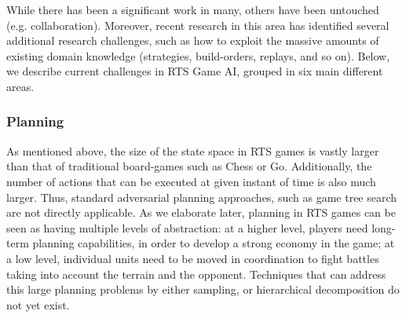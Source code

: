 \documentclass[journal]{IEEEtran}
\begin{document}
While there has been a significant work in many, others have been untouched (e.g. collaboration). Moreover, recent research in this area has identified several additional research challenges, such as how to exploit the massive amounts of existing domain knowledge (strategies, build-orders, replays, and so on). Below, we describe current challenges in RTS Game AI, grouped in six main different areas.


\subsubsection{Planning}
As mentioned above, the size of the state space in RTS games is vastly larger than that of traditional board-games such as Chess or Go. Additionally, the number of actions that can be executed at given instant of time is also much larger. Thus, standard adversarial planning approaches, such as game tree search are not directly applicable. As we elaborate later, planning in RTS games can be seen as having multiple levels of abstraction: at a higher level, players need long-term planning capabilities, in order to develop a strong economy in the game; at a low level, individual units need to be moved in coordination to fight battles taking into account the terrain and the opponent. Techniques that can address this large planning problems by either sampling, or hierarchical decomposition do not yet exist.
\end{document}
